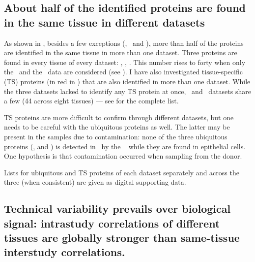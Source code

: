 \subsection{About half of the identified proteins are found in the same tissue
in different datasets}\label{subsec:halfProtConfirmed}

As shown in ,
besides a few exceptions (\oesophagus, \gall\ and \testis),
more than half of the proteins are identified in the same tissue
in more than one dataset.
Three proteins are found in every tissue of every dataset:
,  , .
This number rises to forty when only the \pandey\ and the \kuster\ data
are considered (see ).
I have also investigated tissue-specific (\gls{TS}) proteins
(in red in )
that are also identified in more than one dataset.
While the three datasets lacked to identify any \gls{TS} protein at once,
\pandey\ and \kuster\ datasets share a few (44 across eight tissues)
--- see  for the complete list.
\begin{comment}
twelve for \kidney, nine for \placenta, seven for \pancreas,
five for \adrenal\ and \liver, four for \testis,
and one for \prostate\ and \rectum.
\end{comment}

\gls{TS} proteins are more difficult to confirm
through different datasets,
but one needs to be careful with the ubiquitous proteins as well.
The latter may be present in the samples due to contamination:
none of the three ubiquitous proteins
(,   and )
is detected in \heart\ by the
~
while they are found in epithelial cells.
One hypothesis is that contamination occurred when sampling from the donor.

Lists for ubiquitous and \gls{TS} proteins of each dataset separately
and across the three (when consistent) are given as digital supporting data.

\vspace{-3mm}

\subsection{Technical variability prevails over biological signal:
intrastudy correlations of different tissues are globally stronger than
same-tissue interstudy correlations.}\label{subsec:protTechVarHigh}


